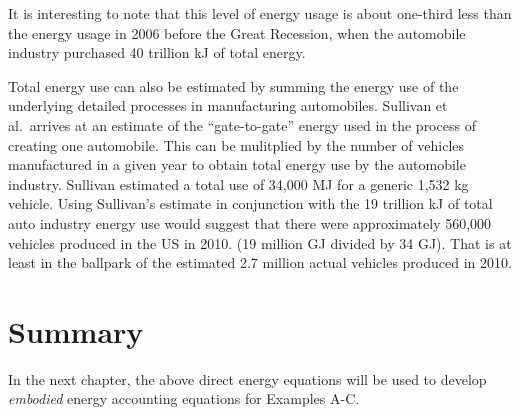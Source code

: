 It is interesting to note that this 
level of energy usage is about one-third less than the energy usage in 2006 before the 
Great Recession, when the automobile industry purchased 40 trillion kJ of total energy.

Total energy use can also be estimated by summing the energy use of the 
underlying detailed processes in manufacturing automobiles. 
Sullivan et al.\ arrives at an estimate of the ``gate-to-gate'' energy
used in the process of creating one automobile.\cite{Sullivan2010} This can be
mulitplied by the number of vehicles manufactured in a given year to obtain total energy use by the 
automobile industry. Sullivan estimated a total use of 34,000 MJ for a generic 1,532 kg vehicle. 
Using Sullivan's estimate in conjunction with the 19 trillion kJ of total auto industry energy use would suggest that there were
approximately 560,000 vehicles produced in the US in 2010. (19 million GJ divided by 34 GJ).  That is at least in the ballpark of the estimated 2.7 million actual vehicles produced in 2010.\cite{Motor-Vehicle-Manufacturers-OICA:2014aa}


\section{Summary}
\label{sec:energy_summary}

In the next chapter, the above direct energy equations will be used to 
develop \emph{embodied} energy accounting equations for Examples A-C.












%
%

